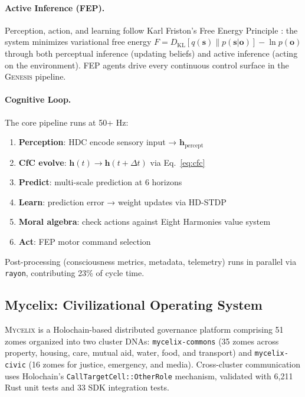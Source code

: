 \documentclass[11pt,letterpaper]{article}
\newcommand{\hv}{\mathbf{h}}
\newcommand{\mycelix}{\textsc{Mycelix}}
\newcommand{\genesis}{\textsc{Genesis}}
\begin{document}
\paragraph{Active Inference (FEP).} Perception, action, and learning follow Karl
Friston's Free Energy Principle \cite{friston2010free,friston2017active}: the
system minimizes variational free energy $F = D_\text{KL}[q(\mathbf{s}) \|
p(\mathbf{s} | \mathbf{o})] - \ln p(\mathbf{o})$ through both perceptual
inference (updating beliefs) and active inference (acting on the environment).
FEP agents drive every continuous control surface in the \genesis{} pipeline.

\paragraph{Cognitive Loop.} The core pipeline runs at 50+ Hz:
\begin{enumerate}[leftmargin=2em,nosep]
\item \textbf{Perception}: HDC encode sensory input → $\hv_\text{percept}$
\item \textbf{CfC evolve}: $\hv(t) \rightarrow \hv(t + \Delta t)$ via Eq.~\ref{eq:cfc}
\item \textbf{Predict}: multi-scale prediction at 6 horizons
\item \textbf{Learn}: prediction error → weight updates via HD-STDP
\item \textbf{Moral algebra}: check actions against Eight Harmonies value system
\item \textbf{Act}: FEP motor command selection
\end{enumerate}
Post-processing (consciousness metrics, metadata, telemetry) runs in parallel
via \texttt{rayon}, contributing 23\% of cycle time.

\subsection{Mycelix: Civilizational Operating System}

\mycelix{} is a Holochain-based distributed governance platform comprising 51
zomes organized into two cluster DNAs: \texttt{mycelix-commons} (35 zomes across
property, housing, care, mutual aid, water, food, and transport) and
\texttt{mycelix-civic} (16 zomes for justice, emergency, and media). Cross-cluster
communication uses Holochain's \texttt{CallTargetCell::OtherRole} mechanism,
validated with 6,211 Rust unit tests and 33 SDK integration tests.
\end{document}
